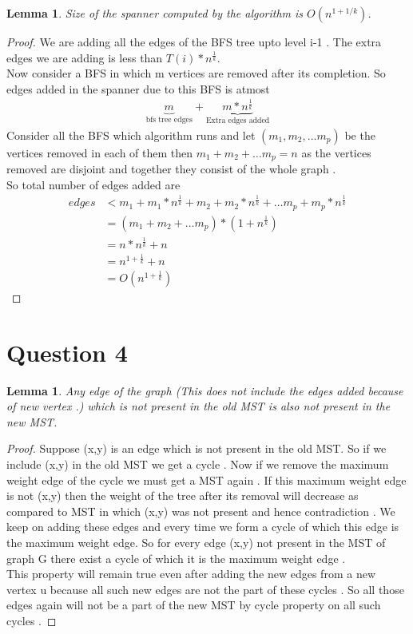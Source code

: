 \documentclass[11pt]{article}
\newtheorem{lemma}[theorem]{Lemma}
\begin{document}
\begin{lemma}
Size of the spanner computed by the algorithm is $O(n^{1+1/k})$.
\end{lemma}
\begin{proof}
We are adding all the edges of the BFS tree upto level i-1 . The extra edges we are adding is less than  $T(i) * n^{\frac{1}{k}}$. \\
Now consider a BFS in which m vertices are removed after its completion. 
So edges added in the spanner due to this BFS is atmost
\begin{align*}
\underbrace{m}_{\text{bfs tree edges}} + \underbrace{m*n^{\frac{1}{k}}}_{\text{Extra edges added}}
\end{align*}
Consider all the BFS which algorithm runs and let $(m_1,m_2, \ldots m_p)$ be the vertices removed in each of them then 
$m_1 + m_2 + \ldots m_p = n$ as the vertices removed are disjoint and together they consist of the whole graph . \\
So total number of edges added are 
\begin{align*}
edges &< m_{1}  + m_{1}*n^\frac{1}{k} + m_{2}  + m_{2}*n^\frac{1}{k} + \ldots m_{p}  + m_{p}*n^\frac{1}{k} \\
&= (m_{1} + m_{2} + \ldots m_{p})*(1+n^{\frac{1}{k}})  \\
&= n*n^{\frac{1}{k}}  + n  \\
&= n^{1+\frac{1}{k}}  + n \\
&= O(n^{1+\frac{1}{k}})
\end{align*}
\end{proof}
\pagebreak
\section*{Question 4}
\begin{lemma}
Any edge of the graph (This does not include the edges added because of new vertex .) which is not present in the old MST is also not present in the new MST. 
\end{lemma}
\begin{proof}
Suppose (x,y) is an edge which is not present in the old MST. So if we include (x,y) in the old MST we get a cycle . Now if we remove the maximum weight edge of the  cycle we must get a MST again . If this maximum weight   edge is not (x,y) then the weight of the tree after its removal will decrease as compared to MST in which (x,y) was not present and hence contradiction . We keep on adding these edges and every time we form a cycle of which this edge is the maximum weight edge. So for every edge (x,y) not present in the MST of graph G there exist a cycle of which it is the maximum weight edge .  \\
This property will remain true even after adding the new edges from a new vertex u because all such new edges are not the part of these cycles  . So all those edges again will not be a part of the new MST by cycle property on all such cycles . 
\end{proof}
\end{document}

